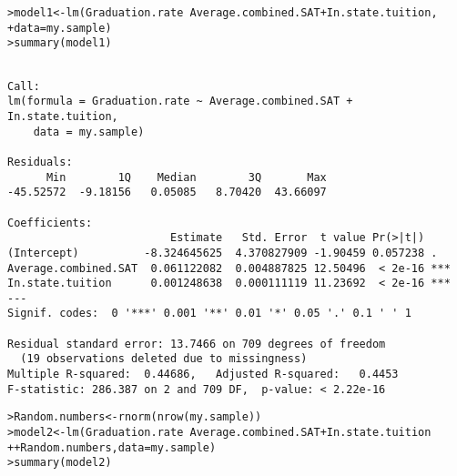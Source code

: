\documentclass{beamer}\usepackage[]{graphicx}\usepackage[]{color}
\makeatletter
\newcommand{\hlopt}[1]{\textcolor[rgb]{1,0.894,0.769}{#1}}%
\newcommand{\hlstd}[1]{\textcolor[rgb]{1,0.894,0.769}{#1}}%
\newcommand{\hlkwb}[1]{\textcolor[rgb]{0.804,0.776,0.451}{#1}}%
\newcommand{\hlkwc}[1]{\textcolor[rgb]{0.78,0.941,0.545}{#1}}%
\newcommand{\hlkwd}[1]{\textcolor[rgb]{1,0.78,0.769}{#1}}%
\newenvironment{kframe}{%
 \def\at@end@of@kframe{}%
 \ifinner\ifhmode%
  \def\at@end@of@kframe{\end{minipage}}%
  \begin{minipage}{\columnwidth}%
 \fi\fi%
 \def\FrameCommand##1{\hskip\@totalleftmargin \hskip-\fboxsep
 \colorbox{shadecolor}{##1}\hskip-\fboxsep
     \hskip-\linewidth \hskip-\@totalleftmargin \hskip\columnwidth}%
 \MakeFramed {\advance\hsize-\width
   \@totalleftmargin\z@ \linewidth\hsize
   \@setminipage}}%
 {\par\unskip\endMakeFramed%
 \at@end@of@kframe}
\newenvironment{knitrout}{}{} %
\makeatother
\begin{document}
\begin{darkframes}
    \begin{frame}[fragile]
      
      \fontsize{8}{8}
\begin{knitrout}
\begin{kframe}
\begin{alltt}
\hlstd{> }\hlstd{model1} \hlkwb{<-} \hlkwd{lm}\hlstd{(Graduation.rate} \hlopt{~} \hlstd{Average.combined.SAT} \hlopt{+} \hlstd{In.state.tuition,}
\hlstd{+ }             \hlkwc{data}\hlstd{=my.sample)}
\hlstd{> }\hlkwd{summary}\hlstd{(model1)}
\end{alltt}
\begin{verbatim}

Call:
lm(formula = Graduation.rate ~ Average.combined.SAT + In.state.tuition, 
    data = my.sample)

Residuals:
      Min        1Q    Median        3Q       Max 
-45.52572  -9.18156   0.05085   8.70420  43.66097 

Coefficients:
                         Estimate   Std. Error  t value Pr(>|t|)    
(Intercept)          -8.324645625  4.370827909 -1.90459 0.057238 .  
Average.combined.SAT  0.061122082  0.004887825 12.50496  < 2e-16 ***
In.state.tuition      0.001248638  0.000111119 11.23692  < 2e-16 ***
---
Signif. codes:  0 '***' 0.001 '**' 0.01 '*' 0.05 '.' 0.1 ' ' 1

Residual standard error: 13.7466 on 709 degrees of freedom
  (19 observations deleted due to missingness)
Multiple R-squared:  0.44686,	Adjusted R-squared:   0.4453 
F-statistic: 286.387 on 2 and 709 DF,  p-value: < 2.22e-16
\end{verbatim}
\end{kframe}
\end{knitrout}
    \end{frame}

    \begin{frame}[fragile]
      \fontsize{8}{8}
\begin{knitrout}
\begin{kframe}
\begin{alltt}
\hlstd{> }\hlstd{Random.numbers} \hlkwb{<-} \hlkwd{rnorm}\hlstd{(}\hlkwd{nrow}\hlstd{(my.sample))}
\hlstd{> }\hlstd{model2} \hlkwb{<-} \hlkwd{lm}\hlstd{(Graduation.rate} \hlopt{~} \hlstd{Average.combined.SAT} \hlopt{+} \hlstd{In.state.tuition}
\hlstd{+ }               \hlopt{+} \hlstd{Random.numbers,} \hlkwc{data}\hlstd{=my.sample)}
\hlstd{> }\hlkwd{summary}\hlstd{(model2)}
\end{alltt}
\begin{verbatim}


\end{verbatim}
\end{kframe}
\end{knitrout}
\end{frame}
\end{darkframes}
\end{document}
